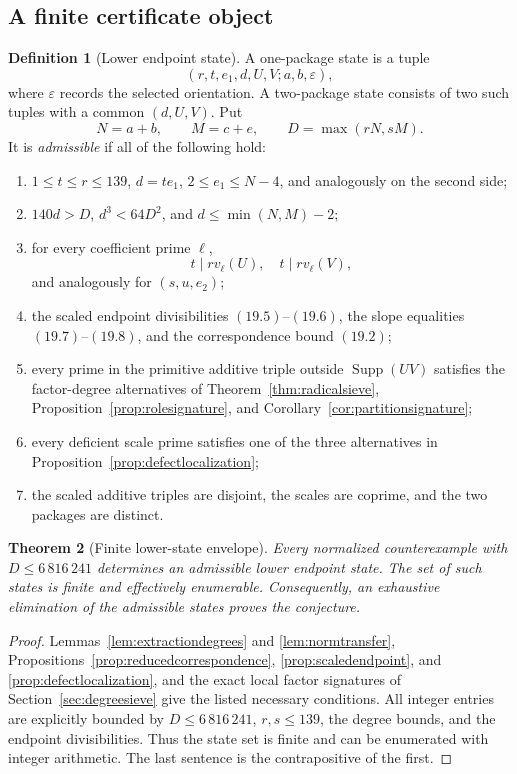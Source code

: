\documentclass[11pt]{article}
\newtheorem{theorem}{Theorem}[section]
\theoremstyle{definition}
\newtheorem{definition}[theorem]{Definition}
\begin{document}
\subsection{A finite certificate object}

\begin{definition}[Lower endpoint state]\label{def:endpointstate}
A one-package state is a tuple
\[
 (r,t,e_1,d,U,V;a,b,\varepsilon),
\]
where \(\varepsilon\) records the selected orientation.  A two-package state
consists of two such tuples with a common \((d,U,V)\).  Put
\[
 N=a+b,\qquad M=c+e,\qquad D=\max(rN,sM).
\]
It is \emph{admissible} if all of the following hold:
\begin{enumerate}[label=(\roman*)]
\item \(1\leq t\leq r\leq139\), \(d=te_1\),
\(2\leq e_1\leq N-4\), and analogously on the second side;
\item \(140d>D\), \(d^3<64D^2\), and
\(d\leq\min(N,M)-2\);
\item for every coefficient prime \(\ell\),
\[
 t\mid r v_\ell(U),\quad t\mid r v_\ell(V),
\]
and analogously for \((s,u,e_2)\);
\item the scaled endpoint divisibilities \((19.5)\)--\((19.6)\), the slope
equalities \((19.7)\)--\((19.8)\), and the correspondence bound \((19.2)\);
\item every prime in the primitive additive triple outside
\(\operatorname{Supp}(UV)\) satisfies the factor-degree alternatives of
Theorem~\ref{thm:radicalsieve}, Proposition~\ref{prop:rolesignature}, and
Corollary~\ref{cor:partitionsignature};
\item every deficient scale prime satisfies one of the three alternatives in
Proposition~\ref{prop:defectlocalization};
\item the scaled additive triples are disjoint, the scales are coprime, and
the two packages are distinct.
\end{enumerate}
\end{definition}

\begin{theorem}[Finite lower-state envelope]
\label{thm:lowerstatereduction}
Every normalized counterexample with \(D\leq6\,816\,241\) determines an
admissible lower endpoint state.  The set of such states is finite and
effectively enumerable.  Consequently, an exhaustive elimination of the
admissible states proves the conjecture.
\end{theorem}

\begin{proof}
Lemmas~\ref{lem:extractiondegrees} and \ref{lem:normtransfer},
Propositions~\ref{prop:reducedcorrespondence},
\ref{prop:scaledendpoint}, and \ref{prop:defectlocalization}, and the exact
local factor signatures of Section~\ref{sec:degreesieve} give the listed
necessary conditions.  All integer entries are explicitly bounded by
\(D\leq6\,816\,241\), \(r,s\leq139\), the degree bounds, and the endpoint
divisibilities.  Thus the state set is finite and can be enumerated with
integer arithmetic.  The last sentence is the contrapositive of the first.
\end{proof}
\end{document}
